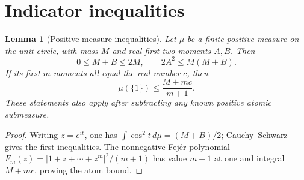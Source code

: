 \documentclass[11pt,a4paper]{article}
\newtheorem{lemma}[theorem]{Lemma}
\theoremstyle{definition}\newtheorem{definition}[theorem]{Definition}
\theoremstyle{remark}\newtheorem{remark}[theorem]{Remark}
\numberwithin{equation}{section}
\begin{document}
\section{Indicator inequalities}\label{sec:moments}
\begin{lemma}[Positive-measure inequalities]\label{core:lem:measure-tools}
Let $\mu$ be a finite positive measure on the unit circle, with mass
$M$ and real first two moments $A,B$. Then
\[
 0\le M+B\le2M,\qquad 2A^2\le M(M+B).
\]
If its first $m$ moments all equal the real number $c$, then
\[
 \mu(\{1\})\le\frac{M+mc}{m+1}.
\]
These statements also apply after subtracting any known positive
atomic submeasure.
\end{lemma}
\begin{proof}
Writing $z=e^{it}$, one has
$\int\cos^2t\,d\mu=(M+B)/2$; Cauchy--Schwarz gives the first
inequalities. The nonnegative Fej\'er polynomial
$F_m(z)=|1+z+\cdots+z^m|^2/(m+1)$ has value $m+1$ at one and
integral $M+mc$, proving the atom bound.
\end{proof}
\end{document}
